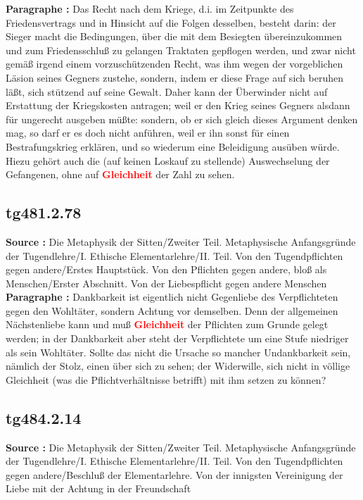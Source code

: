 \documentclass[a4paper,12pt,twoside]{book}
\newcommand{\match}[1]{\textcolor{red}{\textbf{#1}}}
\begin{document}
	\textbf{Paragraphe : }Das Recht nach dem Kriege, d.i. im Zeitpunkte des Friedensvertrags und in Hinsicht auf die Folgen desselben,  besteht darin: der Sieger macht die Bedingungen, über die mit dem Besiegten übereinzukommen und zum Friedensschluß zu gelangen Traktaten gepflogen werden, und zwar nicht gemäß irgend einem vorzuschützenden Recht, was ihm wegen der vorgeblichen Läsion seines Gegners zustehe, sondern, indem er diese Frage auf sich beruhen läßt, sich stützend auf seine Gewalt. Daher kann der Überwinder nicht auf Erstattung der Kriegskosten antragen; weil er den Krieg seines Gegners alsdann für ungerecht ausgeben müßte: sondern, ob er sich gleich dieses Argument denken mag, so darf er es doch nicht anführen, weil er ihn sonst für einen Bestrafungskrieg erklären, und so wiederum eine Beleidigung ausüben würde. Hiezu gehört auch die (auf keinen Loskauf zu stellende) Auswechselung der Gefangenen, ohne auf \match{Gleichheit} der Zahl zu sehen. 
	
	\subsection*{tg481.2.78} 
	\textbf{Source : }Die Metaphysik der Sitten/Zweiter Teil. Metaphysische Anfangsgründe der Tugendlehre/I. Ethische Elementarlehre/II. Teil. Von den Tugendpflichten gegen andere/Erstes Hauptstück. Von den Pflichten gegen andere, bloß als Menschen/Erster Abschnitt. Von der Liebespflicht gegen andere Menschen\\  
	
	\textbf{Paragraphe : }Dankbarkeit ist eigentlich nicht Gegenliebe des Verpflichteten gegen den Wohltäter, sondern Achtung vor demselben. Denn der allgemeinen Nächstenliebe kann und muß \match{Gleichheit} der Pflichten zum Grunde gelegt werden; in der Dankbarkeit aber steht der Verpflichtete um eine Stufe niedriger als sein Wohltäter. Sollte das nicht die Ursache so mancher Undankbarkeit sein, nämlich der Stolz,  einen über sich zu sehen; der Widerwille, sich nicht in völlige Gleichheit (was die Pflichtverhältnisse betrifft) mit ihm setzen zu können? 
	
	\subsection*{tg484.2.14} 
	\textbf{Source : }Die Metaphysik der Sitten/Zweiter Teil. Metaphysische Anfangsgründe der Tugendlehre/I. Ethische Elementarlehre/II. Teil. Von den Tugendpflichten gegen andere/Beschluß der Elementarlehre. Von der innigsten Vereinigung der Liebe mit der Achtung in der Freundschaft\\  
	
\end{document}
